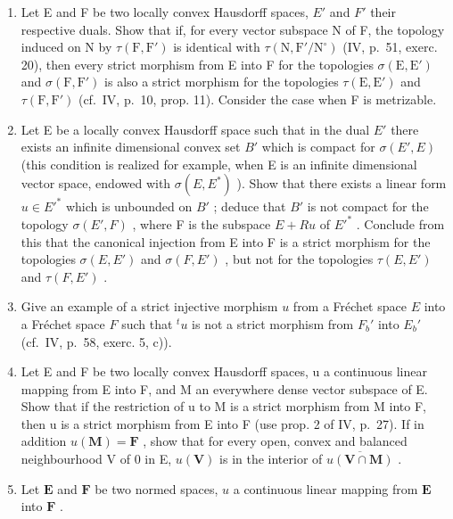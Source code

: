 \exercisegroup

\begin{enumerate}
\def\labelenumi{\arabic{enumi})}
\item
  Let E and F be two locally convex Hausdorff spaces, \(E'\) and \(F'\) their respective duals. Show that if, for every vector subspace N of F, the topology induced on N by \(\tau(\mathrm{F}, \mathrm{F}')\) is identical with \(\tau(\mathrm{N}, \mathrm{F}'/\mathrm{N}^{\circ})\) (IV, p.~51, exerc. 20), then every strict morphism from E into F for the topologies \(\sigma(\mathrm{E}, \mathrm{E}')\) and \(\sigma(\mathrm{F}, \mathrm{F}')\) is also a strict morphism for the topologies \(\tau(\mathrm{E}, \mathrm{E}')\) and \(\tau(\mathrm{F}, \mathrm{F}')\) (cf.~IV, p.~10, prop. 11). Consider the case when F is metrizable.
\item
  Let E be a locally convex Hausdorff space such that in the dual \(E'\) there exists an infinite dimensional convex set \(B'\) which is compact for \(\sigma(E', E)\) (this condition is realized for example, when E is an infinite dimensional vector space, endowed with \(\sigma(E, E^{*})\) ). Show that there exists a linear form \(u \in E'^{*}\) which is unbounded on \(B'\) ; deduce that \(B'\) is not compact for the topology \(\sigma(E', F)\) , where F is the subspace \(E + Ru\) of \(E'^{*}\) . Conclude from this that the canonical injection from E into F is a strict morphism for the topologies \(\sigma(E, E')\) and \(\sigma(F, E')\) , but not for the topologies \(\tau(E, E')\) and \(\tau(F, E')\) .
\item
  Give an example of a strict injective morphism \(u\) from a Fréchet space \(E\) into a Fréchet space \(F\) such that \(^t u\) is not a strict morphism from \(F_b'\) into \(E_b'\) (cf.~IV, p.~58, exerc. 5, c)).
\item
  Let E and F be two locally convex Hausdorff spaces, u a continuous linear mapping from E into F, and M an everywhere dense vector subspace of E. Show that if the restriction of u to M is a strict morphism from M into F, then u is a strict morphism from E into F (use prop. 2 of IV, p.~27). If in addition \(u(\mathbf{M}) = \mathbf{F}\) , show that for every open, convex and balanced neighbourhood V of 0 in E, \(u(\mathbf{V})\) is in the interior of \(\overline{u(\mathbf{V} \cap \mathbf{M})}\) .
\item
  Let \(\mathbf{E}\) and \(\mathbf{F}\) be two normed spaces, \(u\) a continuous linear mapping from \(\mathbf{E}\) into \(\mathbf{F}\) .
\end{enumerate}

